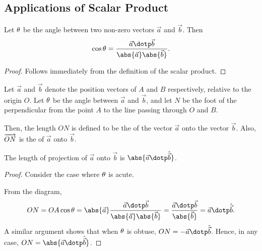 \subsection{Applications of Scalar Product}

\begin{proposition}
    Let $\theta$ be the angle between two non-zero vectors $\vec a$ and $\vec b$. Then \[\cos \t = \frac{\vec a \dotp \vec b}{\abs{\vec a} \abs{\vec b}}.\]
\end{proposition}
\begin{proof}
    Follows immediately from the definition of the scalar product.
\end{proof}

\begin{definition}
    Let $\vec a$ and $\vec b$ denote the position vectors of $A$ and $B$ respectively, relative to the origin $O$. Let $\theta$ be the angle between $\vec a$ and $\vec b$, and let $N$ be the foot of the perpendicular from the point $A$ to the line passing through $O$ and $B$.

    Then, the length $ON$ is defined to be the  of the vector $\vec a$ onto the vector $\vec b$. Also, $\overrightarrow{ON}$ is the  of $\vec a$ onto $\vec b$.
\end{definition}

\begin{proposition}
    The length of projection of $\vec a$ onto $\vec b$ is $\abs{\vec a \dotp \hat{\vec b}}$.
\end{proposition}
\begin{proof}
    Consider the case where $\theta$ is acute.

    \begin{figure}[H]
        \centering
        \caption{\label{fig:336}}
    \end{figure}

    From the diagram, \[ON = OA \cos \t = \abs{\vec a} \frac{\vec a \dotp \vec b}{\abs{\vec a} \abs{\vec b}} = \frac{\vec a \dotp \vec b}{\abs{\vec b}} = \vec a \dotp \hat{\vec b}.\] A similar argument shows that when $\theta$ is obtuse, $ON = -\vec a \dotp \hat{\vec b}$. Hence, in any case, $ON = \abs{\vec a \dotp \hat{\vec b}}$.
\end{proof}

